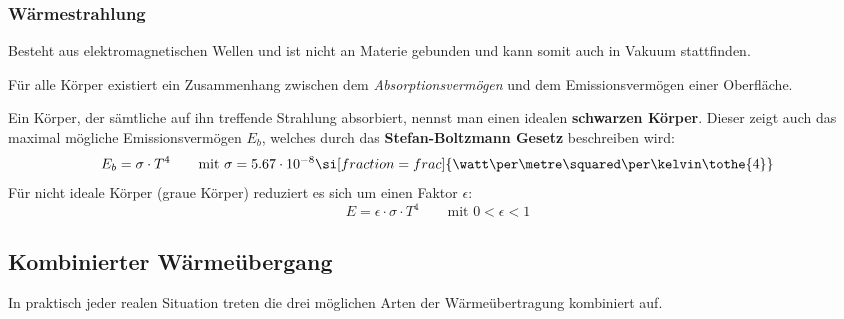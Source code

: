 		\subsubsection{Wärmestrahlung} %
			Besteht aus elektromagnetischen Wellen und ist nicht an Materie gebunden und kann somit auch in Vakuum stattfinden.
			
			Für alle Körper existiert ein Zusammenhang zwischen dem \emph{Absorptionsvermögen} und dem Emissionsvermögen einer Oberfläche.
			
			Ein Körper, der sämtliche auf ihn treffende Strahlung absorbiert, nennst man einen idealen \textbf{schwarzen Körper}.
			Dieser zeigt auch das maximal mögliche Emissionsvermögen $E_b$, welches durch das \textbf{Stefan-Boltzmann Gesetz} beschreiben wird:
			\begin{equation*}
				E_b = \sigma \cdot T^4 \qquad \text{mit } \sigma = 5.67\cdot 10^{-8} \si[fraction=frac]{\watt\per\metre\squared\per\kelvin\tothe{4}}
			\end{equation*}
			Für nicht ideale Körper (graue Körper) reduziert es sich um einen Faktor $\epsilon$:
			\begin{equation*}
				E = \epsilon\cdot\sigma\cdot T^4 \qquad \text{mit } 0 < \epsilon < 1
			\end{equation*}
	\subsection{Kombinierter Wärmeübergang} %
		In praktisch jeder realen Situation treten die drei möglichen Arten der Wärmeübertragung kombiniert auf.
